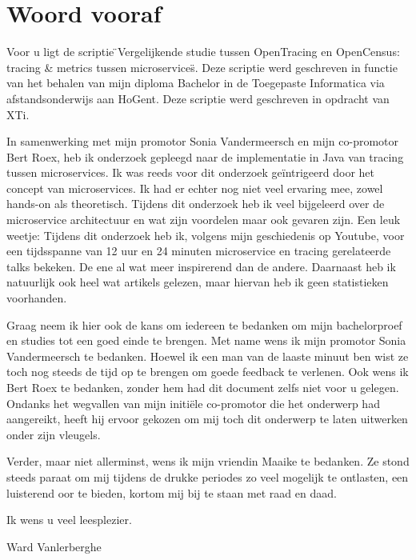 
\chapter*{Woord vooraf}
\label{ch:voorwoord}

Voor u ligt de scriptie \"{}Vergelijkende studie tussen OpenTracing en OpenCensus: tracing \& metrics tussen microservices\"{}. Deze scriptie werd geschreven in functie van het behalen van mijn diploma Bachelor in de Toegepaste Informatica via afstandsonderwijs aan HoGent. Deze scriptie werd geschreven in opdracht van XTi.

In samenwerking met mijn promotor Sonia Vandermeersch en mijn co-promotor Bert Roex, heb ik onderzoek gepleegd naar de implementatie in Java van tracing tussen microservices. Ik was reeds voor dit onderzoek geïntrigeerd door het concept van microservices. Ik had er echter nog niet veel ervaring mee, zowel hands-on als theoretisch. Tijdens dit onderzoek heb ik veel bijgeleerd over de microservice architectuur en wat zijn voordelen maar ook gevaren zijn. Een leuk weetje: Tijdens dit onderzoek heb ik, volgens mijn geschiedenis op Youtube, voor een tijdsspanne van 12 uur en 24 minuten microservice en tracing gerelateerde talks bekeken. De ene al wat meer inspirerend dan de andere. Daarnaast heb ik natuurlijk ook heel wat artikels gelezen, maar hiervan heb ik geen statistieken voorhanden.

Graag neem ik hier ook de kans om iedereen te bedanken om mijn bachelorproef en studies tot een goed einde te brengen. Met name wens ik mijn promotor Sonia Vandermeersch te bedanken. Hoewel ik een man van de laaste minuut ben wist ze toch nog steeds de tijd op te brengen om goede feedback te verlenen. Ook wens ik Bert Roex te bedanken, zonder hem had dit document zelfs niet voor u gelegen. Ondanks het wegvallen van mijn initiële co-promotor die het onderwerp had aangereikt, heeft hij ervoor gekozen om mij toch dit onderwerp te laten uitwerken onder zijn vleugels.

Verder, maar niet allerminst, wens ik mijn vriendin Maaike te bedanken. Ze stond steeds paraat om mij tijdens de drukke periodes zo veel mogelijk te ontlasten, een luisterend oor te bieden, kortom mij bij te staan met raad en daad.

Ik wens u veel leesplezier.

Ward Vanlerberghe
